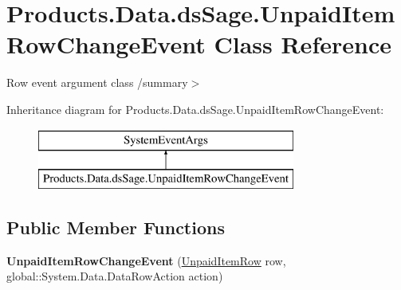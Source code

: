 \hypertarget{class_products_1_1_data_1_1ds_sage_1_1_unpaid_item_row_change_event}{}\section{Products.\+Data.\+ds\+Sage.\+Unpaid\+Item\+Row\+Change\+Event Class Reference}
\label{class_products_1_1_data_1_1ds_sage_1_1_unpaid_item_row_change_event}


Row event argument class /summary$>$  


Inheritance diagram for Products.\+Data.\+ds\+Sage.\+Unpaid\+Item\+Row\+Change\+Event\+:\begin{figure}[H]
\begin{center}
\leavevmode
\includegraphics[height=2.000000cm]{class_products_1_1_data_1_1ds_sage_1_1_unpaid_item_row_change_event}
\end{center}
\end{figure}
\subsection*{Public Member Functions}
\begin{DoxyCompactItemize}
\item 
{\bfseries Unpaid\+Item\+Row\+Change\+Event} (\hyperlink{class_products_1_1_data_1_1ds_sage_1_1_unpaid_item_row}{Unpaid\+Item\+Row} row, global\+::\+System.\+Data.\+Data\+Row\+Action action)\hypertarget{class_products_1_1_data_1_1ds_sage_1_1_unpaid_item_row_change_event_aa7faa951833cc380a3a054c32be7a15d}{}\label{class_products_1_1_data_1_1ds_sage_1_1_unpaid_item_row_change_event_aa7faa951833cc380a3a054c32be7a15d}

\end{DoxyCompactItemize}
